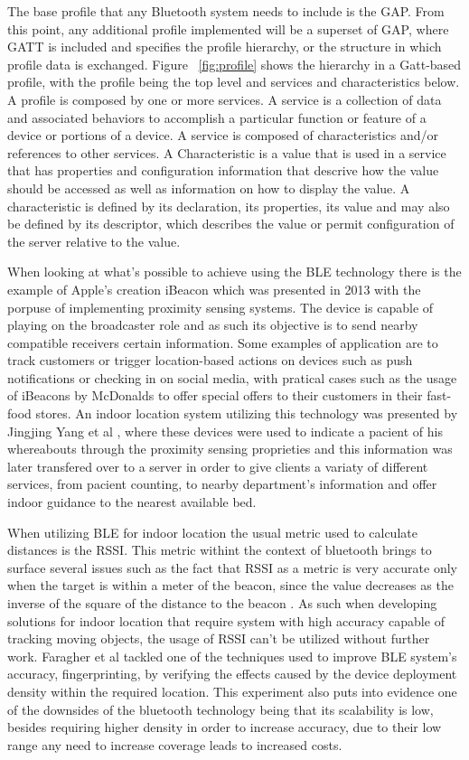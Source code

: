 \documentclass[a4paper]{IEEEtran}
\begin{document}
The base profile that any Bluetooth system needs to include is the GAP. From this point, any additional profile implemented will be a superset of GAP, where GATT is included and specifies the profile hierarchy, or the structure in which profile data is exchanged. Figure  ~\ref{fig:profile} shows the hierarchy in a Gatt-based profile, with the profile being the top level and services and characteristics below. 
A profile is composed by one or more services. A service is a collection of data and associated behaviors to accomplish a particular function or feature of a device or portions of a device. A service is composed of characteristics and/or references to other services.
A Characteristic is a value that is used in a service that has properties and configuration information that descrive how the value should be accessed as well as information on how to display the value. A characteristic is defined by its declaration, its properties, its value and may also be defined by its descriptor, which describes the value or permit configuration of the server relative to the value.


When looking at what's possible to achieve using the BLE technology there is the example of Apple's creation iBeacon which was presented in 2013 with the porpuse of implementing proximity sensing systems. The device is capable of playing on the broadcaster role and as such its objective is to send nearby compatible receivers certain information. Some examples of application are to track customers or trigger location-based actions on devices such as push notifications or checking in on social media, with pratical cases such as the usage of iBeacons by McDonalds to offer special offers to their customers in their fast-food stores. An indoor location system utilizing this technology was presented by Jingjing Yang et al \cite{ibeacon}, where these devices were used to indicate a pacient of his whereabouts through the proximity sensing proprieties and this information was later transfered over to a server in order to give clients a variaty of different services, from pacient counting, to nearby department's information and offer indoor guidance to the nearest available bed. 

When utilizing BLE for indoor location the usual metric used to calculate distances is the RSSI. This metric withint the context of bluetooth brings to surface several issues such as the fact that RSSI as a metric is very accurate only when the target is within a meter of the beacon, since the value decreases as the inverse of the square of the distance to the beacon . As such when developing solutions for indoor location that require system with high accuracy capable of tracking moving objects, the usage of RSSI can't be utilized without further work. Faragher et al \cite{bleacc} tackled one of the techniques used to improve BLE system's accuracy, fingerprinting, by verifying the effects caused by the device deployment density within the required location. This experiment also puts into evidence one of the downsides of the bluetooth technology being that its scalability is low, besides requiring higher density in order to increase accuracy, due to their low range any need to increase coverage leads to increased costs.
\end{document}
